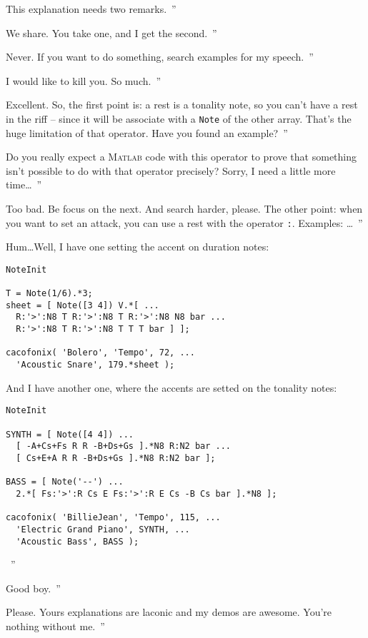 \documentclass{article}
\newcommand{\matlab}{\textsc{Matlab}\xspace}
\newcommand{\note}{\lstinline!Note!\xspace}
\newenvironment{meenv}{ \par \noindent \makebox[6em][r]{ \textcolor{mecolor}{Me}: `` --~}}{~''}
\newenvironment{myselfenv}{ \par \noindent \makebox[6em][r]{ \textcolor{myselfcolor}{Myself}: `` --~}}{~''}
\newcommand{\me}[1]{\begin{meenv}#1\end{meenv}}
\newcommand{\myself}[1]{\begin{myselfenv}#1\end{myselfenv}}
\begin{document}
\me{This explanation needs two remarks.}
\myself{We share. You take one, and I get the second.}
\me{Never. If you want to do something, search examples for my speech.}
\myself{I would like to kill you. So much.}
\me{Excellent. So, the first point is: a rest is a tonality note, so you can't have a rest in the riff -- since it will be associate with a \note of the other array. That's the huge limitation of that operator. Have you found an example?}
\myself{Do you really expect a \matlab code with this operator to prove that something isn't possible to do with that operator precisely? Sorry, I need a little more time\dots}
\me{Too bad. Be focus on the next. And search harder, please. The other point: when you want to set an attack, you can use a rest with the operator \lstinline!:!. Examples: \dots}
\begin{myselfenv}
  Hum\dots Well, I have one setting the accent on duration notes:


\begin{lstlisting}
NoteInit

T = Note(1/6).*3;
sheet = [ Note([3 4]) V.*[ ...
  R:'>':N8 T R:'>':N8 T R:'>':N8 N8 bar ...
  R:'>':N8 T R:'>':N8 T T T bar ] ];

cacofonix( 'Bolero', 'Tempo', 72, ...
  'Acoustic Snare', 179.*sheet );
\end{lstlisting}

  And I have another one, where the accents are setted on the tonality notes:


\begin{lstlisting}
NoteInit

SYNTH = [ Note([4 4]) ...
  [ -A+Cs+Fs R R -B+Ds+Gs ].*N8 R:N2 bar ...
  [ Cs+E+A R R -B+Ds+Gs ].*N8 R:N2 bar ];

BASS = [ Note('--') ...
  2.*[ Fs:'>':R Cs E Fs:'>':R E Cs -B Cs bar ].*N8 ];

cacofonix( 'BillieJean', 'Tempo', 115, ...
  'Electric Grand Piano', SYNTH, ...
  'Acoustic Bass', BASS );
\end{lstlisting}
\end{myselfenv}
\me{Good boy.}
\myself{Please. Yours explanations are laconic and my demos are awesome. You're nothing without me.}
\end{document}
